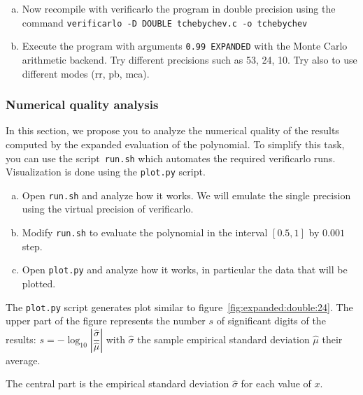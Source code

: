 \begin{question}
  \begin{enumerate}[(a)]
  \item Now recompile with verificarlo the program in double precision using the command
    {\tt verificarlo -D DOUBLE tchebychev.c -o tchebychev} \\
  \item Execute the program with arguments \texttt{0.99 EXPANDED} with the Monte Carlo arithmetic backend. Try different precisions such as 53, 24, 10. Try also to use different modes (rr, pb, mca).
  \end{enumerate}
\end{question}

\subsubsection{Numerical quality analysis}

In this section, we propose you to analyze the numerical quality of the results computed by the expanded evaluation of the polynomial. To simplify this task, you can use the script~\texttt{run.sh} which automates the required verificarlo runs. Visualization is done using the \texttt{plot.py} script.


\begin{question}
  \begin{enumerate}[(a)]
 \item Open {\tt run.sh} and analyze how it works. We will emulate the single precision using the virtual precision of verificarlo.
  \item Modify {\tt run.sh} to evaluate the polynomial in the interval $[0.5,1]$ by $0.001$ step.
  \item Open {\tt plot.py} and analyze how it works, in particular the data that will be plotted.
  \end{enumerate}
\end{question}









The \texttt{plot.py} script generates plot similar to
figure~\ref{fig:expanded:double:24}.
The upper part of the figure represents the number $s$ of significant digits of the results: $s=-\log_{10}\left|\dfrac{\hat\sigma}{\hat\mu}\right|$ with $\hat\sigma$ the sample empirical standard deviation  $\hat\mu$ their average.


The central part is the empirical standard deviation $\hat\sigma$ for each value of $x$.

